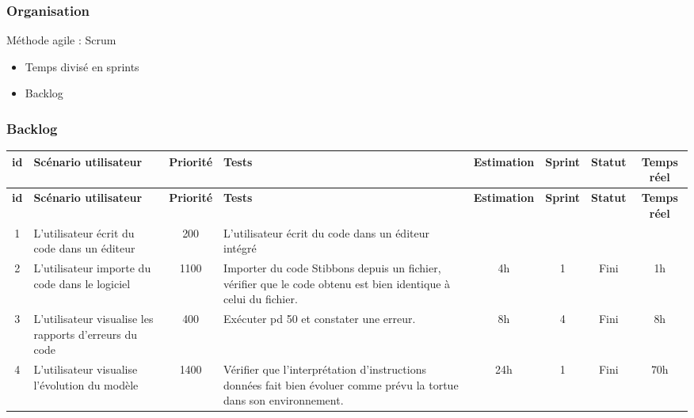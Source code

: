 \begin{frame}
\frametitle{Organisation}
Méthode agile : Scrum
\begin{itemize}
\item Temps divisé en sprints
\item Backlog
\end{itemize}
\end{frame}


\begin{frame}
\frametitle{Backlog}
{\tiny
\begin{longtable}[c]{|c|p{1cm}|c|p{1.7cm}|*{4}{c|}}
\hline
\bf id & \bf Scénario utilisateur & \bf Priorité & \bf Tests & \bf Estimation & \bf Sprint & \bf Statut & \bf Temps réel \\
\hline
\endfirsthead
\hline
\bf id & \bf Scénario utilisateur & \bf Priorité & \bf Tests & \bf Estimation & \bf Sprint & \bf Statut & \bf Temps réel \\
\hline
\endhead
1 & L'utilisateur écrit du code dans un éditeur & 200 & L'utilisateur écrit du code dans un éditeur intégré & & & & \\
\hline
2 & L'utilisateur importe du code dans le logiciel & 1100 & Importer du code Stibbons depuis un fichier, vérifier que le code obtenu est bien identique à celui du fichier. & 4h & 1 & Fini & 1h \\
\hline
3 & L'utilisateur visualise les rapports d'erreurs du code & 400 & Exécuter pd 50 et constater une erreur. & 8h & 4 & Fini & 8h \\
\hline
4 & L'utilisateur visualise l'évolution du modèle & 1400 & Vérifier que l'interprétation d'instructions données fait bien évoluer comme prévu la tortue dans son environnement. & 24h & 1 & Fini & 70h \\
\hline
\end{longtable}}
\end{frame}


